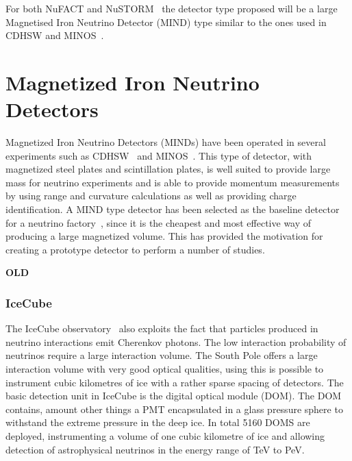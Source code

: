 For both NuFACT and NuSTORM~\cite{77nustorm} the detector type proposed will be a large Magnetised Iron Neutrino Detector (MIND) type  similar to the ones used in CDHSW and MINOS~\cite{NuFACTIDS}.

\section{Magnetized Iron Neutrino Detectors}\label{subsec:MINDdetector}

Magnetized Iron Neutrino Detectors (MINDs) have been operated in several experiments such as CDHSW~\cite{40CDHSW} and MINOS~\cite{MINOS}. This type of detector, with magnetized steel plates and scintillation plates, is well suited to provide large mass for neutrino experiments and is able to provide momentum measurements by using range and curvature calculations as well as providing charge identification. A MIND type detector has been selected as the baseline detector for a neutrino factory~\cite{ISS, 27Bross}, since it is the cheapest and most effective way of producing a large magnetized volume. This has provided the motivation for creating a prototype detector to perform a number of studies.


\textbf{OLD}

\subsubsection{IceCube}
The IceCube observatory~\cite{43IceCube} also exploits the fact that particles produced in neutrino interactions emit Cherenkov photons. The low interaction probability of neutrinos require a large interaction volume. The South Pole offers a large interaction volume with very good optical qualities, using this is possible to instrument cubic kilometres of ice with a rather sparse spacing of detectors. The basic detection unit in IceCube is the digital optical module (DOM). The DOM contains, amount other things a PMT encapsulated in a glass pressure sphere to withstand the extreme pressure in the deep ice. In total 5160 DOMS are deployed, instrumenting a volume of one cubic kilometre of ice and allowing detection of astrophysical neutrinos in the energy range of TeV to PeV.

